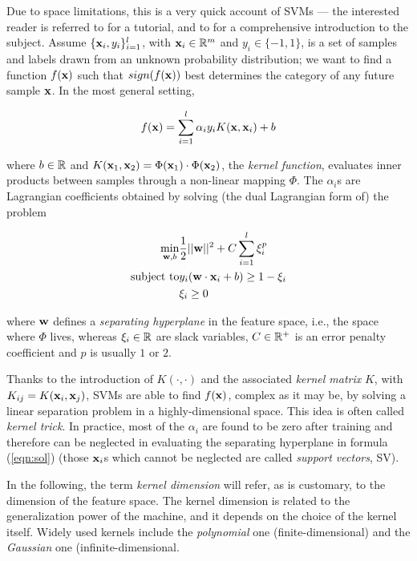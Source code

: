 Due to space limitations, this is a very quick account of SVMs --- the
interested reader is referred to \cite{Burges98} for a tutorial, and
to \cite{Cristianini00} for a comprehensive introduction to the
subject. Assume $\{\mathbf{x}_i,y_i\}_{i=1}^l$, with $\mathbf{x}_i \in \mathbb{R}^m$ and
$y_i \in \{-1,1\}$, is a set of samples and labels drawn from an
unknown probability distribution; we want to find a function $f(\mathbf{x})$
such that $sign(f(\mathbf{x}))$ best determines the category of any future
sample $\mathbf{x}$. In the most general setting,

\begin{equation} \label{eqn:sol}
  f(\mathbf{x}) = \sum_{i=1}^l \alpha_i y_i K(\mathbf{x},\mathbf{x}_i) + b
\end{equation}

\noindent where $b \in \mathbb{R}$ and $K(\mathbf{x}_1,\mathbf{x}_2) = \Phi(\mathbf{x}_1)
\cdot \Phi(\mathbf{x}_2)$, the \emph{kernel function}, evaluates inner
products between samples through a non-linear mapping $\Phi$. The
$\alpha_i$s are Lagrangian coefficients obtained by solving (the dual
Lagrangian form of) the problem

\begin{eqnarray} \label{eqn:svm_primal}
  \min_{\mathbf{w},b}      & \frac{1}{2} ||\mathbf{w}||^2 + C \sum_{i=1}^l \xi_i^p \\
  \mbox{subject to} & y_i (\mathbf{w}\cdot\mathbf{x}_i + b) \geq 1-\xi_i            \nonumber \\
                    & \xi_i \geq 0                                    \nonumber
\end{eqnarray}

\noindent where $\mathbf{w}$ defines a \emph{separating hyperplane}
in the feature space, i.e., the space where $\Phi$ lives, whereas
$\xi_i \in \mathbb{R}$ are slack variables, $C \in \mathbb{R}^+$ is an error penalty
coefficient and $p$ is usually $1$ or $2$.

Thanks to the introduction of $K(\cdot,\cdot)$ and the associated
\emph{kernel matrix} $K$, with $K_{ij} = K(\mathbf{x}_i,\mathbf{x}_j)$, SVMs are
able to find $f(\mathbf{x})$, complex as it may be, by solving a linear
separation problem in a highly-dimensional space. This idea is often
called \emph{kernel trick}. In practice, most of the $\alpha_i$ are
found to be zero after training and therefore can be neglected in
evaluating the separating hyperplane in formula (\ref{eqn:sol}) (those
$\mathbf{x}_i$s which cannot be neglected are called \emph{support vectors},
SV).

In the following, the term \emph{kernel dimension} will refer, as is
customary, to the dimension of the feature space. The kernel dimension
is related to the generalization power of the machine, and it depends
on the choice of the kernel itself. Widely used kernels include the
\emph{polynomial} one (finite-dimensional) and the \emph{Gaussian} one
(infinite-dimensional.
